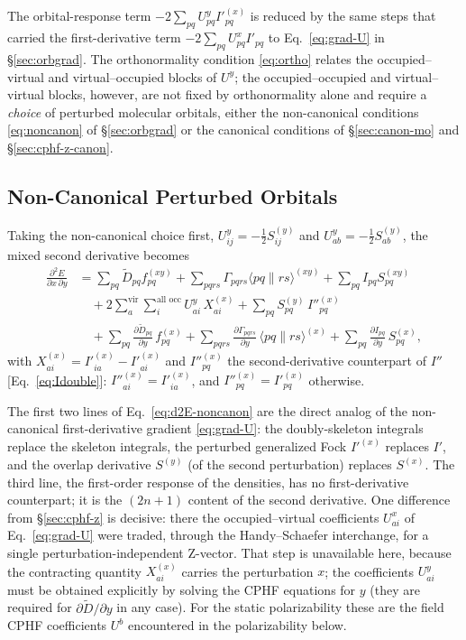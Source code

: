 \documentclass[12pt]{article}
\newcommand{\adb}[2]{\langle #1 \| #2 \rangle}
\newcommand{\vir}{\text{vir}}
\newcommand{\alloc}{\text{all occ}}   %
\begin{document}
The orbital-response term $-2\sum_{pq}U^y_{pq}I'^{(x)}_{pq}$ is reduced by the
same steps that carried the first-derivative term $-2\sum_{pq}U^x_{pq}I'_{pq}$ to
Eq.~\eqref{eq:grad-U} in \S\ref{sec:orbgrad}.  The orthonormality condition \eqref{eq:ortho}
relates the occupied--virtual and virtual--occupied blocks of $U^y$; the
occupied--occupied and virtual--virtual blocks, however, are not fixed by
orthonormality alone and require a {\em choice} of perturbed molecular orbitals,
either the non-canonical conditions \eqref{eq:noncanon} of \S\ref{sec:orbgrad} or the canonical
conditions of \S\ref{sec:canon-mo} and \S\ref{sec:cphf-z-canon}.

\subsection{Non-Canonical Perturbed Orbitals}
\label{sec:2nd-noncanon}

Taking the non-canonical choice first,
$U^y_{ij}=-\tfrac12 S^{(y)}_{ij}$ and $U^y_{ab}=-\tfrac12 S^{(y)}_{ab}$, the mixed
second derivative becomes
\begin{align}
\frac{\partial^2 E}{\partial x\,\partial y}
&= \sum_{pq}\tilde D_{pq} f^{(xy)}_{pq}
+ \sum_{pqrs}\Gamma_{pqrs}\adb{pq}{rs}^{(xy)}
+ \sum_{pq} I_{pq} S^{(xy)}_{pq}
\nonumber\\
&\quad
+ 2\sum_{a}^{\vir}\sum_{i}^{\alloc} U^y_{ai}\,X^{(x)}_{ai}
+ \sum_{pq} S^{(y)}_{pq}\,I''^{(x)}_{pq}
\nonumber\\
&\quad
+ \sum_{pq}\frac{\partial \tilde D_{pq}}{\partial y}\,f^{(x)}_{pq}
+ \sum_{pqrs}\frac{\partial \Gamma_{pqrs}}{\partial y}\,\adb{pq}{rs}^{(x)}
+ \sum_{pq}\frac{\partial I_{pq}}{\partial y}\,S^{(x)}_{pq},
\label{eq:d2E-noncanon}
\end{align}
with $X^{(x)}_{ai}=I'^{(x)}_{ia}-I'^{(x)}_{ai}$ and $I''^{(x)}_{pq}$ the
second-derivative counterpart of $I''$ [Eq.~\eqref{eq:Idouble}]:
$I''^{(x)}_{ai}=I'^{(x)}_{ia}$, and $I''^{(x)}_{pq}=I'^{(x)}_{pq}$ otherwise.

The first two lines of Eq.~\eqref{eq:d2E-noncanon} are the direct analog of the
non-canonical first-derivative gradient \eqref{eq:grad-U}: the doubly-skeleton
integrals replace the skeleton integrals, the perturbed generalized Fock
$I'^{(x)}$ replaces $I'$, and the overlap derivative $S^{(y)}$ (of the second
perturbation) replaces $S^{(x)}$.  The third line, the first-order response of
the densities, has no first-derivative counterpart; it is the $(2n+1)$ content
of the second derivative.  One difference from \S\ref{sec:cphf-z} is decisive: there the
occupied--virtual coefficients $U^x_{ai}$ of Eq.~\eqref{eq:grad-U} were traded,
through the Handy--Schaefer interchange, for a single perturbation-independent
Z-vector.  That step is unavailable here, because the contracting quantity
$X^{(x)}_{ai}$ carries the perturbation $x$; the coefficients $U^y_{ai}$ must be
obtained explicitly by solving the CPHF equations for $y$ (they are required for
$\partial\tilde D/\partial y$ in any case).  For the static polarizability these
are the field CPHF coefficients $U^b$ encountered in the polarizability below.
\end{document}
